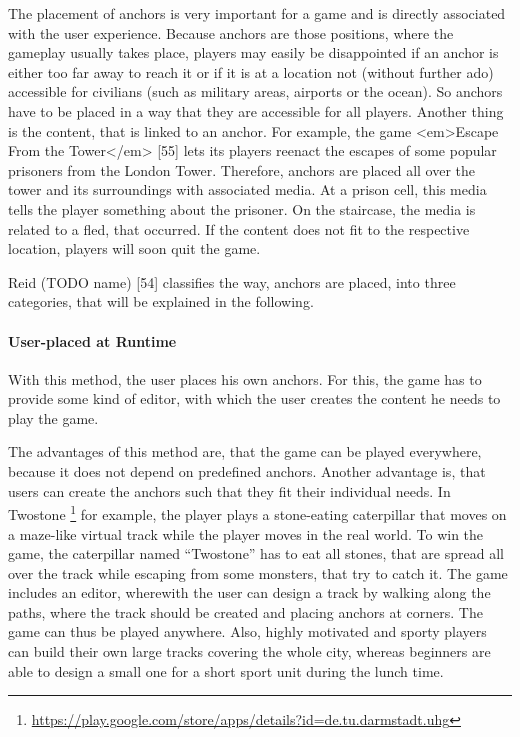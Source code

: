 The placement of anchors is very important for a game and is directly associated with the user experience. Because anchors are those positions, where the gameplay usually takes place, players may easily be disappointed if an anchor is either too far away to reach it or if it is at a location not (without further ado) accessible for civilians (such as military areas, airports or the ocean). So anchors have to be placed in a way that they are accessible for all players.
Another thing is the content, that is linked to an anchor. For example, the game <em>Escape From the Tower</em> [55] lets its players reenact the escapes of some popular prisoners from the London Tower. Therefore, anchors are placed all over the tower and its surroundings with associated media. At a prison cell, this media tells the player something about the prisoner. On the staircase, the media is related to a fled, that occurred. If the content does not fit to the respective location, players will soon quit the game.

Reid (TODO name) [54] classifies the way, anchors are placed, into three categories, that will be explained in the following.

\paragraph{User-placed at Runtime}
With this method, the user places his own anchors. For this, the game has to provide some kind of editor, with which the user creates the content he needs to play the game.

The advantages of this method are, that the game can be played everywhere, because it does not depend on predefined anchors. Another advantage is, that users can create the anchors such that they fit their individual needs. In Twostone \footnote{\url{https://play.google.com/store/apps/details?id=de.tu.darmstadt.uhg}} for example, the player plays a stone-eating caterpillar that moves on a maze-like virtual track while the player moves in the real world. To win the game, the caterpillar named “Twostone” has to eat all stones, that are spread all over the track while escaping from some monsters, that try to catch it. The game includes an editor, wherewith the user can design a track by walking along the paths, where the track should be created and placing anchors at corners. The game can thus be played anywhere. Also, highly motivated and sporty players can build their own large tracks covering the whole city, whereas beginners are able to design a small one for a short sport unit during the lunch time.

